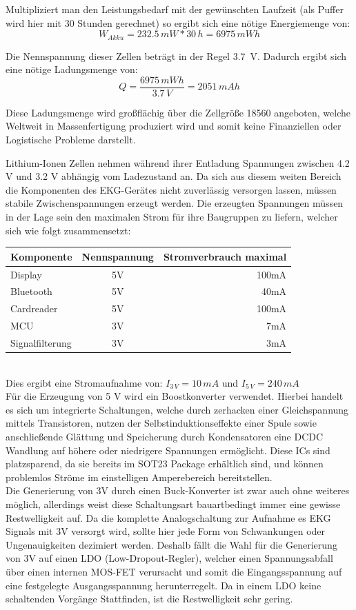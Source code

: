 Multipliziert man den Leistungsbedarf mit der gewünschten Laufzeit (als Puffer wird hier mit 30 Stunden gerechnet) so ergibt sich eine nötige Energiemenge von:
$$ W_{Akku} = 232.5\,mW * 30\,h = 6975\,mWh $$

Die Nennspannung dieser Zellen beträgt in der Regel \SI{3,7}{\volt}. Dadurch ergibt sich eine nötige Ladungsmenge von: 
$$ Q = \frac{6975\,mWh}{3.7\,V} = 2051\,mAh $$

Diese Ladungsmenge wird großflächig über die Zellgröße 18560 angeboten, welche Weltweit in Massenfertigung produziert wird und somit keine Finanziellen oder Logistische Probleme darstellt.

Lithium-Ionen Zellen nehmen während ihrer Entladung Spannungen zwischen 4.2 V und 3.2 V abhängig vom Ladezustand an. Da sich aus diesem weiten Bereich die Komponenten des EKG-Gerätes nicht zuverlässig versorgen lassen, müssen stabile Zwischenspannungen erzeugt werden. Die erzeugten Spannungen müssen in der Lage sein den maximalen Strom für ihre Baugruppen zu liefern, welcher sich wie folgt zusammensetzt:\\

\begin{tabular}[h]{l|c|r}
Komponente & Nennspannung & Stromverbrauch maximal\\
\hline
Display & 5V & 100mA \\
Bluetooth & 5V & 40mA \\
Cardreader & 5V & 100mA \\
MCU & 3V & 7mA \\
Signalfilterung & 3V & 3mA \\
\end{tabular}\\

Dies ergibt eine Stromaufnahme von: $ I_{3\,V} = 10\,mA$ und $I_{5\,V} = 240\,mA $ \\

Für die Erzeugung von 5 V wird ein Boostkonverter verwendet. Hierbei handelt es sich um integrierte Schaltungen, welche durch zerhacken einer Gleichspannung mittels Transistoren, nutzen der Selbstinduktionseffekte einer Spule sowie anschließende Glättung und Speicherung durch Kondensatoren eine DCDC Wandlung auf höhere oder niedrigere Spannungen ermöglicht. Diese ICs sind platzsparend, da sie bereits im SOT23 Package erhältlich sind, und können problemlos Ströme im einstelligen Amperebereich bereitstellen. \\

Die Generierung von 3V durch einen Buck-Konverter ist zwar auch ohne weiteres möglich, allerdings weist diese Schaltungsart bauartbedingt immer eine gewisse Restwelligkeit auf. Da die komplette Analogschaltung zur Aufnahme es EKG Signals mit 3V versorgt wird, sollte hier jede Form von Schwankungen oder Ungenauigkeiten dezimiert werden.
Deshalb fällt die Wahl für die Generierung von 3V auf einen LDO (Low-Dropout-Regler), welcher einen Spannungsabfall über einen internen MOS-FET verursacht und somit die Eingangsspannung auf eine festgelegte Ausgangsspannung herunterregelt. Da in einem LDO keine schaltenden Vorgänge Stattfinden, ist die Restwelligkeit sehr gering.\\

